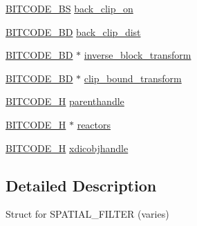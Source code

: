 \begin{DoxyCompactItemize}
\hyperlink{dwg_8h_a94297606fbd4a4ff97e8add284af0809}{\-B\-I\-T\-C\-O\-D\-E\-\_\-\-B\-S} \hyperlink{struct__dwg__object__SPATIAL__FILTER_aaf04ff4dd66ac7a90cb9c15d17f4851c}{back\-\_\-clip\-\_\-on}
\item 
\hyperlink{dwg_8h_a3c1e6781466b74ba07785d57da70ed97}{\-B\-I\-T\-C\-O\-D\-E\-\_\-\-B\-D} \hyperlink{struct__dwg__object__SPATIAL__FILTER_a33ca55a70776f42df6099a61759f9f76}{back\-\_\-clip\-\_\-dist}
\item 
\hyperlink{dwg_8h_a3c1e6781466b74ba07785d57da70ed97}{\-B\-I\-T\-C\-O\-D\-E\-\_\-\-B\-D} $\ast$ \hyperlink{struct__dwg__object__SPATIAL__FILTER_aed3c25745127da95092489f226e720e9}{inverse\-\_\-block\-\_\-transform}
\item 
\hyperlink{dwg_8h_a3c1e6781466b74ba07785d57da70ed97}{\-B\-I\-T\-C\-O\-D\-E\-\_\-\-B\-D} $\ast$ \hyperlink{struct__dwg__object__SPATIAL__FILTER_ae407f3b838a6b0e858108718cfc92657}{clip\-\_\-bound\-\_\-transform}
\item 
\hyperlink{dwg_8h_a7c700e94e047a97ba8c24bdfe4029dc3}{\-B\-I\-T\-C\-O\-D\-E\-\_\-\-H} \hyperlink{struct__dwg__object__SPATIAL__FILTER_ac54e52cc1d2676f1e1e3afbd2005fa87}{parenthandle}
\item 
\hyperlink{dwg_8h_a7c700e94e047a97ba8c24bdfe4029dc3}{\-B\-I\-T\-C\-O\-D\-E\-\_\-\-H} $\ast$ \hyperlink{struct__dwg__object__SPATIAL__FILTER_a18076d6614709c75792baced825018fb}{reactors}
\item 
\hyperlink{dwg_8h_a7c700e94e047a97ba8c24bdfe4029dc3}{\-B\-I\-T\-C\-O\-D\-E\-\_\-\-H} \hyperlink{struct__dwg__object__SPATIAL__FILTER_aeece031f9b8c3e67397d3be7667ebe19}{xdicobjhandle}
\end{DoxyCompactItemize}


\subsection{\-Detailed \-Description}
\-Struct for \-S\-P\-A\-T\-I\-A\-L\-\_\-\-F\-I\-L\-T\-E\-R (varies) 

